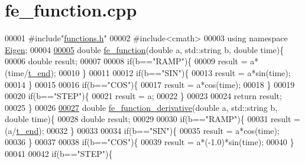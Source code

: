\hypertarget{fe__function_8cpp_source}{}\section{fe\+\_\+function.\+cpp}
\label{fe__function_8cpp_source}

\begin{DoxyCode}
00001 \textcolor{preprocessor}{#include"\hyperlink{functions_8h}{functions.h}"}
00002 \textcolor{preprocessor}{#include<cmath>}
00003 \textcolor{keyword}{using namespace }\hyperlink{namespace_eigen}{Eigen};
00004 
\hyperlink{fe__function_8cpp_a5ce8a3cf9dcc8b599ac40f7f3a48f196}{00005} \textcolor{keywordtype}{double} \hyperlink{fe__function_8cpp_a5ce8a3cf9dcc8b599ac40f7f3a48f196}{fe\_function}(\textcolor{keywordtype}{double} a, std::string b, \textcolor{keywordtype}{double} time)\{
00006   \textcolor{keywordtype}{double} result;
00007 
00008   \textcolor{keywordflow}{if}(b==\textcolor{stringliteral}{"RAMP"})\{
00009     result = a*(time/\hyperlink{_global_variables_8h_a4b637c5fff609e604a3b2b2787f4a9fa}{t\_end});
00010   \}
00011 
00012   \textcolor{keywordflow}{if}(b==\textcolor{stringliteral}{"SIN"})\{
00013     result = a*sin(time);
00014   \}
00015 
00016   \textcolor{keywordflow}{if}(b==\textcolor{stringliteral}{"COS"})\{
00017     result = a*cos(time);
00018   \}
00019 
00020   \textcolor{keywordflow}{if}(b==\textcolor{stringliteral}{"STEP"})\{
00021     result = a;
00022   \}
00023 
00024   \textcolor{keywordflow}{return} result;
00025 \}
00026 
\hyperlink{fe__function_8cpp_aa587b020c768e2a11948bfd939829b6e}{00027} \textcolor{keywordtype}{double} \hyperlink{fe__function_8cpp_aa587b020c768e2a11948bfd939829b6e}{fe\_function\_derivative}(\textcolor{keywordtype}{double} a, std::string b, \textcolor{keywordtype}{double} time)\{
00028   \textcolor{keywordtype}{double} result;
00029 
00030   \textcolor{keywordflow}{if}(b==\textcolor{stringliteral}{"RAMP"})\{
00031     result = (a/\hyperlink{_global_variables_8h_a4b637c5fff609e604a3b2b2787f4a9fa}{t\_end});
00032   \}
00033 
00034   \textcolor{keywordflow}{if}(b==\textcolor{stringliteral}{"SIN"})\{
00035     result = a*cos(time);
00036   \}
00037 
00038   \textcolor{keywordflow}{if}(b==\textcolor{stringliteral}{"COS"})\{
00039     result = a*(-1.0)*sin(time);
00040   \}
00041 
00042   \textcolor{keywordflow}{if}(b==\textcolor{stringliteral}{"STEP"})\{

\end{DoxyCode}
